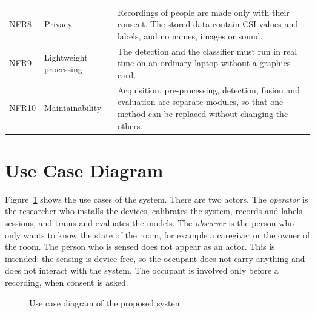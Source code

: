 {\begin{longtable}{L{1.3cm}L{2.7cm}L{9.6cm}}
NFR8 & Privacy & Recordings of people are made only with their consent. The stored data contain CSI values and labels, and no names, images or sound.\\\addlinespace
NFR9 & Lightweight processing & The detection and the classifier must run in real time on an ordinary laptop without a graphics card.\\\addlinespace
NFR10 & Maintainability & Acquisition, pre-processing, detection, fusion and evaluation are separate modules, so that one method can be replaced without changing the others.\\
\end{longtable}
}

\section{Use Case Diagram}
Figure~\ref{fig:usecase} shows the use cases of the system. There are two actors. The \emph{operator} is the researcher who installs the devices, calibrates the system, records and labels sessions, and trains and evaluates the models. The \emph{observer} is the person who only wants to know the state of the room, for example a caregiver or the owner of the room. The person who is sensed does not appear as an actor. This is intended: the sensing is device-free, so the occupant does not carry anything and does not interact with the system. The occupant is involved only before a recording, when consent is asked.

\begin{figure}[htbp]
\centering{}
\caption{Use case diagram of the proposed system}
\label{fig:usecase}
\end{figure}

